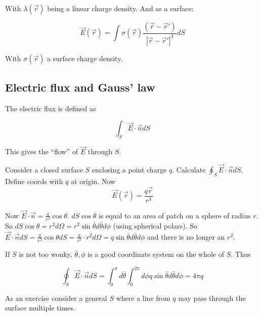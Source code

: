 With $\lambda(\vec{r})$ being a linear charge density. And as a surface:

\begin{equation}
\vec{E}(\vec{r}) = \int \sigma (\vec{r}) \frac{(\vec{r} - \vec{r}')}{| \vec{r} - \vec{r}'|^3} dS
\end{equation}

With $\sigma (\vec{r})$ a surface charge density.

\subsection{Electric flux and Gauss' law}

The electric flux is defined as

\begin{equation}
\displaystyle \int_S \vec{E} \cdot \vec{n} dS
\end{equation}

This gives the ``flow'' of $\vec{E}$ through $S$.

\vspace{\baselineskip}

Consider a closed surface $S$ enclosing a point charge $q$. Calculate $\oint_S \vec{E} \cdot \vec{n} dS$. Define coords with $q$ at origin. Now $$\vec{E}(\vec{r}) = \frac{q \vec{r}}{r^3}$$

Now $\vec{E} \cdot \vec{n} = \frac{q}{r^2} \cos \theta$. $dS \cos \theta$ is equal to an area of patch on a sphere of radius $r$. So $dS \cos \theta = r^2 d \Omega = r^2 \sin \bar{\theta} d \bar{\theta} d \phi$ (using spherical polars). So $\vec{E} \cdot \vec{n} dS = \frac{q}{r^2} \cos \theta dS = \frac{q}{r^2} \cdot r^2 d \Omega = q \sin \bar{\theta} d \bar{\theta} d \phi$ and there is no longer an $r^2$.

If $S$ is not too wonky, $\bar{\theta}, \phi$ is a good coordinate system on the whole of $S$. Thus

\begin{equation}
\oint_S \vec{E} \cdot \vec{n} dS = \int_0^{\pi} d \bar{\theta} \int_0^{2 \pi} d \phi q \sin \bar{\theta} d \bar{\theta} d \phi = 4 \pi q
\end{equation}

As an exercise consider a general $S$ where a line from $q$ may pass through the surface multiple times.